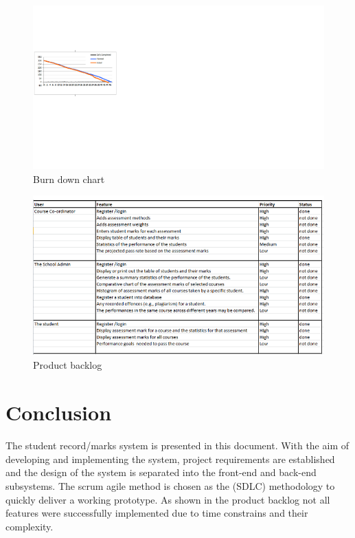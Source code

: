 \documentclass[10pt,onecolumn]{MainDocument}
\begin{document}
\begin{center}
\begin{figure}[h]
\centering
\includegraphics[trim = {0 8.5cm 25cm 4.5cm},clip, scale=1]{burndown}
\caption{Burn down chart}
\end{figure}
\end{center}

\newpage

\begin{center}
\begin{figure}[h]
\centering
\includegraphics[trim = {0 0cm 0cm 0cm},clip, scale=1]{product_backlog}
\caption{Product backlog}
\end{figure}
\end{center}


\section{Conclusion}

The student record/marks system is presented in this document. With the aim of developing and implementing the system, project requirements are established and the design of the system is separated into the front-end and back-end subsystems. The scrum agile method is chosen as the (SDLC) methodology to quickly deliver a working prototype. As shown in the product backlog not all features were successfully implemented due to time constrains and their complexity.   

\newpage



\end{document}
